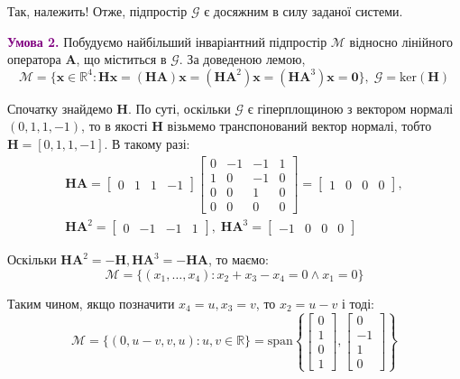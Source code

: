 \documentclass[oneside,solution]{karazin-control-assign}
\begin{document}
Так, належить! Отже, підпростір $\mathcal{G}$ є досяжним в силу заданої системи.

\textcolor{purple}{\textbf{Умова 2.}} Побудуємо найбільший інваріантний підпростір $\mathcal{M}$ відносно лінійного оператора $\boldsymbol{A}$, що міститься в $\mathcal{G}$. За доведеною лемою,
\begin{equation}
    \mathcal{M} = \{\mathbf{x} \in \mathbb{R}^4: \boldsymbol{H}\mathbf{x} = (\boldsymbol{HA})\mathbf{x} = (\boldsymbol{H}\boldsymbol{A}^2)\mathbf{x} = (\boldsymbol{H}\boldsymbol{A}^3)\mathbf{x} = \mathbf{0}\}, \; \mathcal{G} = \text{ker}(\boldsymbol{H})
\end{equation}

Спочатку знайдемо $\boldsymbol{H}$. По суті, оскільки $\mathcal{G}$ є гіперплощиною з вектором нормалі $(0,1,1,-1)$, то в якості $\boldsymbol{H}$ візьмемо транспонований вектор нормалі, тобто $\boldsymbol{H} = [0,1,1,-1]$. В такому разі:
\begin{gather}
    \boldsymbol{HA} = \begin{bmatrix}
        0 & 1 & 1 & -1
    \end{bmatrix}\begin{bmatrix}
        0 & -1 & -1 & 1 \\
        1 & 0 & -1 & 0 \\
        0 & 0 & 1 & 0 \\
        0 & 0 & 0 & 0 
    \end{bmatrix} = \begin{bmatrix}
        1 & 0 & 0 & 0
    \end{bmatrix}, \\ \boldsymbol{H}\boldsymbol{A}^2=\begin{bmatrix}
        0 & -1 & -1 & 1 
    \end{bmatrix}, \; \boldsymbol{H}\boldsymbol{A}^3 = \begin{bmatrix}
        -1 & 0 & 0 & 0
    \end{bmatrix}
\end{gather}

Оскільки $\boldsymbol{H}\boldsymbol{A}^2=-\boldsymbol{H}, \boldsymbol{H}\boldsymbol{A}^3=-\boldsymbol{HA}$, то маємо:
\begin{equation}
    \mathcal{M} = \{(x_1,\dots,x_4): x_2+x_3-x_4=0 \wedge x_1=0\}
\end{equation}

Таким чином, якщо позначити $x_4=u,x_3=v$, то $x_2=u-v$ і тоді:
\begin{equation}
    \mathcal{M} = \{(0,u-v,v,u): u,v \in \mathbb{R}\} = \text{span}\left\{\begin{bmatrix}
        0 \\ 1 \\ 0 \\ 1
    \end{bmatrix}, \begin{bmatrix}
        0 \\ -1 \\ 1 \\ 0
    \end{bmatrix}\right\}
\end{equation}
\end{document}
